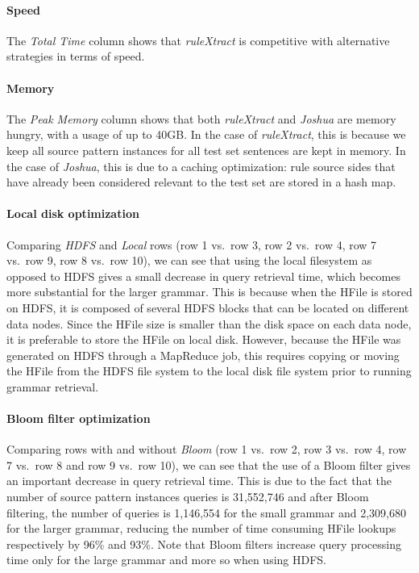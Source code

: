 \paragraph{Speed} The \emph{Total Time} column shows that \emph{ruleXtract} is
    competitive with alternative strategies in terms of speed.
\paragraph{Memory} The \emph{Peak Memory} column shows that both \emph{ruleXtract} and
    \emph{Joshua} are memory hungry, with a usage of up to 40GB. In the case of \emph{ruleXtract},
    this is because we keep all source pattern instances for all test set
    sentences are kept in memory. In the case
    of \emph{Joshua}, this is due to a caching optimization: rule source sides
    that have already been considered relevant to the test set are stored
    in a hash map.
\paragraph{Local disk optimization} Comparing \emph{HDFS} and \emph{Local} rows
    (row 1 vs.\ row 3, row 2 vs.\ row 4, row 7 vs.\ row 9, row 8 vs.\ row 10), we can
    see that using the local filesystem as opposed to HDFS gives a small
    decrease in query retrieval time, which becomes more
    substantial for the larger grammar.
    This is because when the HFile is stored on HDFS, it is composed of several
    HDFS blocks that can be located on different data nodes.
    Since the HFile size is smaller than the disk space on each data node, it is preferable
    to store the HFile on local disk. However, because the HFile was generated on
    HDFS through a MapReduce job, this
    requires copying or moving the HFile from the HDFS file system to the
    local disk file system prior to running grammar retrieval.
\paragraph{Bloom filter optimization} Comparing rows with and without \emph{Bloom}
    (row 1 vs.\ row 2, row 3 vs.\ row 4, row 7 vs.\ row 8 and row 9 vs.\ row 10), we can
    see that the
    use of a Bloom filter gives an important decrease in query retrieval time.
    This is due to the fact that the number of source pattern instances queries
    is 31,552,746 and after Bloom filtering, the number of queries is 1,146,554
    for the small grammar and 2,309,680 for the larger grammar, reducing the
    number of time consuming HFile lookups respectively by 96\% and 93\%. Note
    that Bloom filters increase query processing time only for the
    large grammar and more so when using HDFS.
